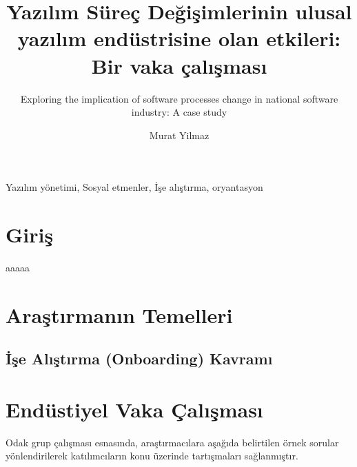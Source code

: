\documentclass{llncs}
\begin{document}

\title{Yazılım Süreç Değişimlerinin ulusal yazılım endüstrisine olan etkileri: Bir vaka çalışması}

\subtitle{Exploring the implication of software processes change in national software industry: A case study}



\author{Murat Yilmaz}



\maketitle

\begin{abstract}


\end{abstract}

\begin{keywords}
Yazılım yönetimi, Sosyal etmenler, İşe alıştırma, oryantasyon
\end{keywords}



\section{Giriş}



aaaaa~\cite{yilmaz2013software}


\section{Araştırmanın Temelleri}


\subsection{İşe Alıştırma (Onboarding) Kavramı}




\section{Endüstiyel Vaka Çalışması}




Odak grup çalışması esnasında, araştırmacılara aşağıda belirtilen örnek sorular yönlendirilerek katılımcıların konu üzerinde tartışmaları sağlanmıştır.
\end{document}

